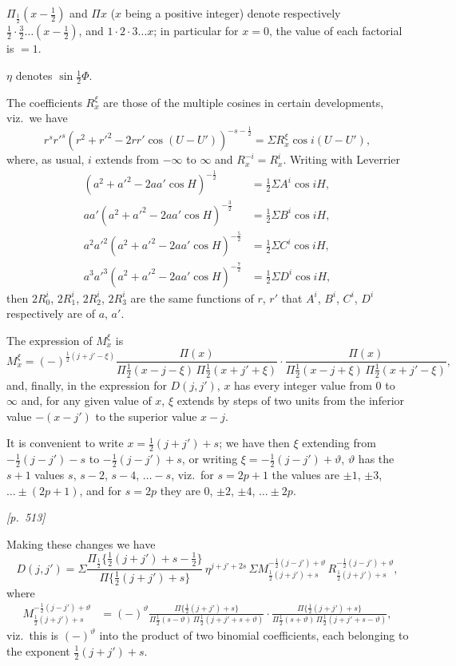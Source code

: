 \documentclass[11pt]{article}
\begin{document}
$\Pi_{\tfrac{1}{2}}(x-\tfrac{1}{2})$ and $\Pi x$ ($x$ being a positive
integer) denote respectively $\tfrac{1}{2}\cdot\tfrac{3}{2}\dots(x-\tfrac{1}{2})$, and
$1\cdot 2\cdot 3\dots x$; in particular for $x=0$, the value of each
factorial is $=1$.

$\eta$ denotes $\sin\tfrac{1}{2}\Phi$.

The coefficients $R_{x}^{\xi}$ are those of the multiple cosines in
certain developments, viz.\ we have
\[
r^{s}r'^{s}(r^{2}+r'^{2}-2rr'\cos(U-U'))^{-s-\tfrac{1}{2}}
=\Sigma R_{x}^{\xi}\cos i(U-U'),
\]
where, as usual, $i$ extends from $-\infty$ to $\infty$ and
$R_{x}^{-i}=R_{x}^{i}$. Writing with Leverrier
\begin{align*}
(a^{2}+a'^{2}-2aa'\cos H)^{-\tfrac{1}{2}} &= \tfrac{1}{2}\Sigma A^{i}\cos iH,\\
aa'(a^{2}+a'^{2}-2aa'\cos H)^{-\tfrac{3}{2}} &= \tfrac{1}{2}\Sigma B^{i}\cos iH,\\
a^{2}a'^{2}(a^{2}+a'^{2}-2aa'\cos H)^{-\tfrac{5}{2}} &= \tfrac{1}{2}\Sigma C^{i}\cos iH,\\
a^{3}a'^{3}(a^{2}+a'^{2}-2aa'\cos H)^{-\tfrac{7}{2}} &= \tfrac{1}{2}\Sigma D^{i}\cos iH,
\end{align*}
then $2R_{0}^{i}$, $2R_{1}^{i}$, $2R_{2}^{i}$, $2R_{3}^{i}$ are the
same functions of $r$, $r'$ that $A^{i}$, $B^{i}$, $C^{i}$, $D^{i}$
respectively are of $a$, $a'$.

The expression of $M_{x}^{\xi}$ is
\[
M_{x}^{\xi}=(-)^{\tfrac{1}{2}(j+j'-\xi)}
\frac{\Pi(x)}{\Pi\tfrac{1}{2}(x-j-\xi)\,\Pi\tfrac{1}{2}(x+j'+\xi)}\cdot
\frac{\Pi(x)}{\Pi\tfrac{1}{2}(x-j+\xi)\,\Pi\tfrac{1}{2}(x+j'-\xi)},
\]
and, finally, in the expression for $D(j,j')$, $x$ has every integer
value from $0$ to $\infty$ and, for any given value of $x$, $\xi$
extends by steps of two units from the inferior value $-(x-j')$ to
the superior value $x-j$.

It is convenient to write $x=\tfrac{1}{2}(j+j')+s$; we have then $\xi$
extending from $-\tfrac{1}{2}(j-j')-s$ to $-\tfrac{1}{2}(j-j')+s$, or
writing $\xi=-\tfrac{1}{2}(j-j')+\vartheta$, $\vartheta$ has the
$s+1$ values $s$, $s-2$, $s-4$, $\ldots-s$, viz.\ for $s=2p+1$ the
values are $\pm 1$, $\pm 3$, $\ldots\pm(2p+1)$, and for $s=2p$ they
are $0$, $\pm 2$, $\pm 4$, $\ldots\pm 2p$.

\medskip

\noindent\textit{[p.~513]}

\medskip

Making these changes we have
\[
D(j,j')=\Sigma\frac{\Pi_{\tfrac{1}{2}}\{\tfrac{1}{2}(j+j')+s-\tfrac{1}{2}\}}
{\Pi\{\tfrac{1}{2}(j+j')+s\}}\,\eta^{j+j'+2s}\,\Sigma M_{\tfrac{1}{2}(j+j')+s}^{-\tfrac{1}{2}(j-j')+\vartheta}\,
R_{\tfrac{1}{2}(j+j')+s}^{-\tfrac{1}{2}(j-j')+\vartheta},
\]
where
\begin{align*}
M_{\tfrac{1}{2}(j+j')+s}^{-\tfrac{1}{2}(j-j')+\vartheta}
&= (-)^{\vartheta}\frac{\Pi\{\tfrac{1}{2}(j+j')+s\}}{\Pi\tfrac{1}{2}(s-\vartheta)\,\Pi\tfrac{1}{2}(j+j'+s+\vartheta)}\cdot
\frac{\Pi\{\tfrac{1}{2}(j+j')+s\}}{\Pi\tfrac{1}{2}(s+\vartheta)\,\Pi\tfrac{1}{2}(j+j'+s-\vartheta)},
\end{align*}
viz.\ this is $(-)^{\vartheta}$ into the product of two binomial
coefficients, each belonging to the exponent $\tfrac{1}{2}(j+j')+s$.
\end{document}
